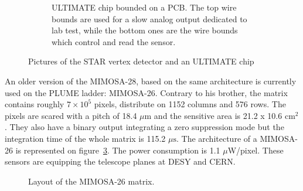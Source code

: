 \begin{figure}[!h]
\begin{subfigure}[t]{0.3\textwidth}
        \caption{ULTIMATE chip bounded on a PCB. The top wire bounds are used for a slow analog output dedicated to lab test, while the bottom ones are the wire bounds which control and read the sensor. }
        \label{fig:ultimate}
    \end{subfigure}
    \caption{Pictures of the STAR vertex detector and an ULTIMATE chip}\label{fig:Mi28}
    \end{figure}    

An older version of the \gls{MIMOSA}-28, based on the same architecture is currently used on the \gls{PLUME} ladder: \gls{MIMOSA}-26.
    Contrary to his brother, the matrix contains roughly $7 \times 10^5$ pixels, distribute on 1152 columns and 576 rows.
    The pixels are scared with a pitch of 18.4 $\mu\text{m}$ and the sensitive area is 21.2 x 10.6 $\text{cm}^2$.
    They also have a binary output integrating a zero suppression mode but the integration time of the whole matrix is 115.2 $\mu\text{s}$.
    The architecture of a \gls{MIMOSA}-26 is represented on figure~\ref{fig:archMi26}.
    The power consumption is 1.1 $\mu$W/pixel.
    These sensors are equipping the telescope planes at DESY and CERN.

    \begin{figure}[!h]
      \caption{Layout of the MIMOSA-26 matrix.}
      \label{fig:archMi26}
    \end{figure}
    


